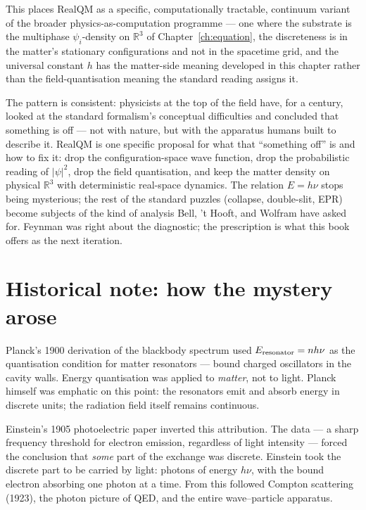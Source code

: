 This places RealQM as a specific, computationally tractable, continuum variant of the broader physics-as-computation programme --- one where the substrate is the multiphase $\psi_i$-density on $\mathbb{R}^3$ of Chapter~\ref{ch:equation}, the discreteness is in the matter's stationary configurations and not in the spacetime grid, and the universal constant $h$ has the matter-side meaning developed in this chapter rather than the field-quantisation meaning the standard reading assigns it.

The pattern is consistent: physicists at the top of the field have, for a century, looked at the standard formalism's conceptual difficulties and concluded that something is off --- not with nature, but with the apparatus humans built to describe it. RealQM is one specific proposal for what that ``something off'' is and how to fix it: drop the configuration-space wave function, drop the probabilistic reading of $|\psi|^2$, drop the field quantisation, and keep the matter density on physical $\mathbb{R}^3$ with deterministic real-space dynamics. The relation $E = h\nu$ stops being mysterious; the rest of the standard puzzles (collapse, double-slit, EPR) become subjects of the kind of analysis Bell, 't Hooft, and Wolfram have asked for. Feynman was right about the diagnostic; the prescription is what this book offers as the next iteration.

\section{Historical note: how the mystery arose}\label{sec:hf-history}

Planck's 1900 derivation of the blackbody spectrum used $E_{\rm resonator} = n h\nu$ as the quantisation condition for matter resonators --- bound charged oscillators in the cavity walls. Energy quantisation was applied to \emph{matter}, not to light. Planck himself was emphatic on this point: the resonators emit and absorb energy in discrete units; the radiation field itself remains continuous.

Einstein's 1905 photoelectric paper inverted this attribution. The data --- a sharp frequency threshold for electron emission, regardless of light intensity --- forced the conclusion that \emph{some} part of the exchange was discrete. Einstein took the discrete part to be carried by light: photons of energy $h\nu$, with the bound electron absorbing one photon at a time. From this followed Compton scattering (1923), the photon picture of QED, and the entire wave--particle apparatus.

